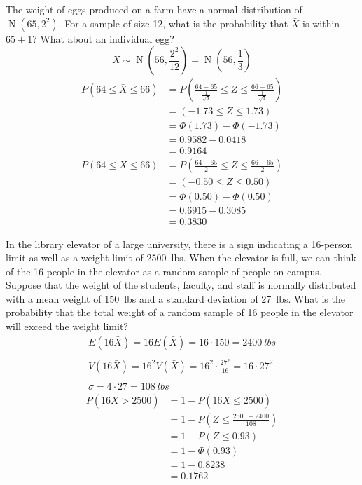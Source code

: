 \documentclass[letterpaper,12pt,fleqn]{article}
\renewcommand{\o}{\sigma}
\renewcommand{\P}{\Phi}
\newcommand{\xb}{\bar{X}}
\DeclareMathOperator{\nd}{N}
\begin{document}
\begin{example}
  The weight of eggs produced on a farm have a normal distribution of \(\nd(65,2^2)\).  For a sample of size 12, what is the
  probability that \(\xb\) is within \(65\pm1\)?  What about an individual egg?
  \[\xb\sim\nd\left(56,\frac{2^2}{12}\right)=\nd\left(56,\frac{1}{3}\right)\]
  \begin{align*}
    P(64\le\xb\le66) &= P\left(\frac{64-65}{\frac{1}{\sqrt{3}}}\le Z\le\frac{66-65}{\frac{1}{\sqrt{3}}}\right) \\
    &= (-1.73\le Z\le1.73) \\
    &= \P(1.73)-\P(-1.73) \\
    &= 0.9582-0.0418 \\
    &= 0.9164
  \end{align*}
  \begin{align*}
    P(64\le X\le66) &= P\left(\frac{64-65}{2}\le Z\le\frac{66-65}{2}\right) \\
    &= (-0.50\le Z\le0.50) \\
    &= \P(0.50)-\P(0.50) \\
    &= 0.6915-0.3085 \\
    &= 0.3830
  \end{align*}
\end{example}

\begin{example}
  In the library elevator of a large university, there is a sign indicating a 16-person limit as well as a weight limit of
  \SI{2500}{lbs}.  When the elevator is full, we can think of the 16 people in the elevator as a random sample of people on
  campus.  Suppose that the weight of the students, faculty, and staff is normally distributed with a mean weight of
  \SI{150}{lbs} and a standard deviation of \SI{27}{lbs}.  What is the probability that the total weight of a random sample
  of 16 people in the elevator will exceed the weight limit?
  \begin{gather*}
    E(16\xb)=16E(\xb)=16\cdot150=\SI{2400}{lbs} \\
    \\
    V(16\xb)=16^2V(\xb)=16^2\cdot\frac{27^2}{16}=16\cdot27^2 \\
    \\
    \o=4\cdot27=\SI{108}{lbs}
  \end{gather*}
  \begin{align*}
    P(16\xb>2500) &= 1-P(16\xb\le2500) \\
    &= 1-P\left(Z\le\frac{2500-2400}{108}\right) \\
    &= 1-P(Z\le0.93) \\
    &= 1-\P(0.93) \\
    &= 1-0.8238 \\
    &= 0.1762
  \end{align*}
\end{example}
\end{document}
